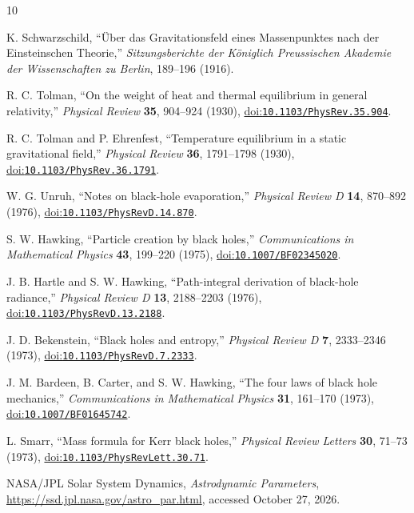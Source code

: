 \documentclass[12pt]{article}
\begin{document}
\begin{thebibliography}{10}
\small
{}
\raggedright
{}

K. Schwarzschild,
``\"Uber das Gravitationsfeld eines Massenpunktes nach der Einsteinschen Theorie,''
\emph{Sitzungsberichte der K\"oniglich Preussischen Akademie der Wissenschaften zu Berlin}, 189--196 (1916).

R. C. Tolman,
``On the weight of heat and thermal equilibrium in general relativity,''
\emph{Physical Review} \textbf{35}, 904--924 (1930),
\href{https://doi.org/10.1103/PhysRev.35.904}{doi:\nolinkurl{10.1103/PhysRev.35.904}}.

R. C. Tolman and P. Ehrenfest,
``Temperature equilibrium in a static gravitational field,''
\emph{Physical Review} \textbf{36}, 1791--1798 (1930),
\href{https://doi.org/10.1103/PhysRev.36.1791}{doi:\nolinkurl{10.1103/PhysRev.36.1791}}.

W. G. Unruh,
``Notes on black-hole evaporation,''
\emph{Physical Review D} \textbf{14}, 870--892 (1976),
\href{https://doi.org/10.1103/PhysRevD.14.870}{doi:\nolinkurl{10.1103/PhysRevD.14.870}}.

S. W. Hawking,
``Particle creation by black holes,''
\emph{Communications in Mathematical Physics} \textbf{43}, 199--220 (1975),
\href{https://doi.org/10.1007/BF02345020}{doi:\nolinkurl{10.1007/BF02345020}}.

J. B. Hartle and S. W. Hawking,
``Path-integral derivation of black-hole radiance,''
\emph{Physical Review D} \textbf{13}, 2188--2203 (1976),
\href{https://doi.org/10.1103/PhysRevD.13.2188}{doi:\nolinkurl{10.1103/PhysRevD.13.2188}}.

J. D. Bekenstein,
``Black holes and entropy,''
\emph{Physical Review D} \textbf{7}, 2333--2346 (1973),
\href{https://doi.org/10.1103/PhysRevD.7.2333}{doi:\nolinkurl{10.1103/PhysRevD.7.2333}}.

J. M. Bardeen, B. Carter, and S. W. Hawking,
``The four laws of black hole mechanics,''
\emph{Communications in Mathematical Physics} \textbf{31}, 161--170 (1973),
\href{https://doi.org/10.1007/BF01645742}{doi:\nolinkurl{10.1007/BF01645742}}.

L. Smarr,
``Mass formula for Kerr black holes,''
\emph{Physical Review Letters} \textbf{30}, 71--73 (1973),
\href{https://doi.org/10.1103/PhysRevLett.30.71}{doi:\nolinkurl{10.1103/PhysRevLett.30.71}}.

NASA/JPL Solar System Dynamics,
\emph{Astrodynamic Parameters},
\url{https://ssd.jpl.nasa.gov/astro_par.html},
accessed October 27, 2026.

\end{thebibliography}
\end{document}
